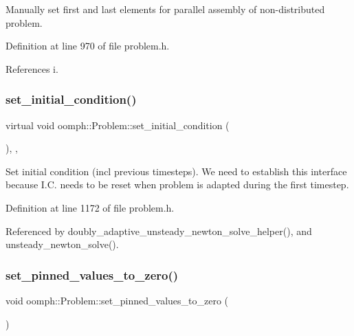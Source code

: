 Manually set first and last elements for parallel assembly of non-\/distributed problem. 



Definition at line 970 of file problem.\+h.



References i.

\mbox{\label{classoomph_1_1Problem_ad48be6d67071f7da5f6feb7c4fc918f0}} 
\subsubsection{\texorpdfstring{set\+\_\+initial\+\_\+condition()}{set\_initial\_condition()}}
{\footnotesize\ttfamily virtual void oomph\+::\+Problem\+::set\+\_\+initial\+\_\+condition (\begin{DoxyParamCaption}{ }\end{DoxyParamCaption})\hspace{0.3cm}{\ttfamily [inline]}, {\ttfamily [protected]}, {\ttfamily [virtual]}}



Set initial condition (incl previous timesteps). We need to establish this interface because I.\+C. needs to be reset when problem is adapted during the first timestep. 



Definition at line 1172 of file problem.\+h.



Referenced by doubly\+\_\+adaptive\+\_\+unsteady\+\_\+newton\+\_\+solve\+\_\+helper(), and unsteady\+\_\+newton\+\_\+solve().

\mbox{\label{classoomph_1_1Problem_a820d3c43c7d678b4fe186a8c83a90732}} 
\subsubsection{\texorpdfstring{set\+\_\+pinned\+\_\+values\+\_\+to\+\_\+zero()}{set\_pinned\_values\_to\_zero()}}
{\footnotesize\ttfamily void oomph\+::\+Problem\+::set\+\_\+pinned\+\_\+values\+\_\+to\+\_\+zero (\begin{DoxyParamCaption}{ }\end{DoxyParamCaption})}



